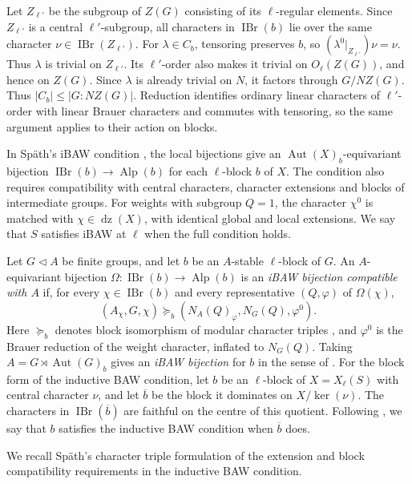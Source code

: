 \documentclass[10pt]{amsart}
\theoremstyle{definition}
\renewcommand{\leq}{\leqslant}
\let\oldendproof\endproof
\renewenvironment{proof}[1][\proofname]{%
  \oldproof[\bfseries #1]%
}{\oldendproof}
\DeclareMathOperator{\Aut}{Aut}
\DeclareMathOperator{\IBr}{IBr}
\DeclareMathOperator{\Alp}{Alp}
\DeclareMathOperator{\dz}{dz}
\numberwithin{equation}{section}
\numberwithin{table}{section}
\begin{document}
\begin{proof}
Let $Z_{\ell'}$ be the subgroup of $Z(G)$ consisting of its
$\ell$-regular elements. Since $Z_{\ell'}$ is a central
$\ell'$-subgroup, all characters in $\IBr(b)$ lie over the same character
$\nu\in\IBr(Z_{\ell'})$. For $\lambda\in C_b$, tensoring preserves
$b$, so $(\lambda^0|_{Z_{\ell'}})\nu=\nu$. Thus $\lambda$ is
trivial on $Z_{\ell'}$. Its $\ell'$-order also makes it trivial on
$O_\ell(Z(G))$, and hence on $Z(G)$. Since $\lambda$ is already trivial on $N$, it factors through
$G/NZ(G)$. Thus $|C_b|\leq |G:NZ(G)|$.
Reduction identifies ordinary linear characters of $\ell'$-order
with linear Brauer characters and commutes with tensoring, so the
same argument applies to their action on blocks.
\end{proof}

In Sp\"ath's iBAW condition \cite[Definition~4.1(i)--(iv)]{Spath2013},
the local bijections give an $\Aut(X)_b$-equivariant bijection
$\IBr(b)\longrightarrow\Alp(b)$ for each $\ell$-block $b$ of $X$.
The condition also requires compatibility with central characters,
character extensions and blocks of intermediate groups. For weights with
subgroup $Q=1$, the character $\chi^0$ is matched with $\chi\in\dz(X)$,
with identical global and local extensions.
We say that $S$ satisfies iBAW at $\ell$ when the full condition holds.

Let $G\lhd A$ be finite groups, and let $b$ be an $A$-stable
$\ell$-block of $G$. An $A$-equivariant bijection
$\Omega:\IBr(b)\longrightarrow\Alp(b)$ is an
\emph{iBAW bijection compatible with $A$} if, for every
$\chi\in\IBr(b)$ and every representative $(Q,\varphi)$ of
$\Omega(\chi)$,
\[
 (A_\chi,G,\chi)\succeq_b
 (N_A(Q)_\varphi,N_G(Q),\varphi^0).
\]
Here $\succeq_b$ denotes block isomorphism of modular character triples
\cite[Definition~3.4]{MartinezRizoRossi2026}, and $\varphi^0$ is
the Brauer reduction of the weight character, inflated to $N_G(Q)$.
Taking $A=G\rtimes\Aut(G)_b$ gives an \emph{iBAW bijection} for $b$
in the sense of \cite[Definition~3.5]{FengLiZhang2022Jordan}.
For the block form of the inductive BAW condition, let $b$ be an
$\ell$-block of $X=X_\ell(S)$ with central character $\nu$, and let
$\overline b$ be the block it dominates on $X/\ker(\nu)$.
The characters in $\IBr(\overline b)$ are faithful on the centre of
this quotient. Following \cite[Definition~3.2]{KoshitaniSpath2016},
we say that $b$ satisfies the inductive BAW condition when $\overline b$ does.

We recall Sp\"ath's character triple formulation of the extension and block
compatibility requirements in the inductive BAW condition.
\end{document}
